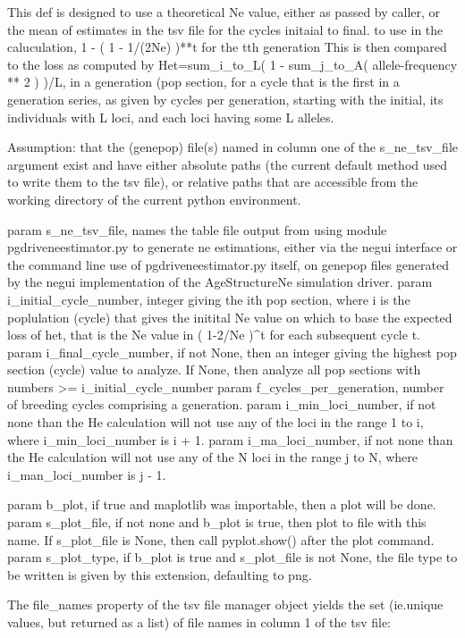 \begin{DoxyVerb}This def is designed to use a theoretical Ne value, either as passed by
caller, or the mean of estimates in the tsv file for the cycles initaial to final.
to use in the caluculation,
        1 - ( 1 - 1/(2Ne) )**t
for the tth generation This is then compared to the loss as computed by
Het=sum_i_to_L(  1 - sum_j_to_A( allele-frequency ** 2 ) )/L, in a generation
(pop section, for a cycle that is the first in a generation series, as given
by cycles per generation, starting with the initial, its individuals with
L loci, and each loci having some L alleles.

Assumption:  that the (genepop) file(s) named in column one of the s_ne_tsv_file 
        argument exist and have either absolute paths (the current
        default method used to write them to the tsv file), or relative
        paths that are accessible from the working directory of the
        current python environment.

param s_ne_tsv_file, names the table file output from using module
    pgdriveneestimator.py to generate ne estimations, either
    via the negui interface or the command line use of pgdriveneestimator.py 
    itself, on genepop files generated by the negui implementation of
    the AgeStructureNe simulation driver.
param i_initial_cycle_number, integer giving the ith pop section,
    where i is the poplulation (cycle) that gives the initital Ne value on which
    to base the expected loss of het, that is the Ne value in ( 1-2/Ne )^t for
    each subsequent cycle t.
param i_final_cycle_number, if not None, then an integer giving the highest pop section
    (cycle) value to analyze.  If None, then analyze all pop sections with numbers 
    >= i_initial_cycle_number
param f_cycles_per_generation, number of breeding cycles comprising a generation.
param i_min_loci_number, if not none than the He calculation will not use any of the loci
        in the range 1 to i, where i_min_loci_number is i + 1.
param i_ma_loci_number, if not none than the He calculation will not use any of the N loci
        in the range j to N, where i_man_loci_number is j - 1.

param b_plot, if true and maplotlib was importable, then a plot will be done.
param s_plot_file, if not none and b_plot is true, then plot to file with this name.
        If s_plot_file is None, then call pyplot.show() after the plot command.
param s_plot_type, if b_plot is true and s_plot_file is not None, the file type
        to be written is given by this extension, defaulting to png.\end{DoxyVerb}
\begin{DoxyVerb}The file_names property of the tsv file manager object
yields the set (ie.unique values, but returned as a list) 
of file names in column 1 of the tsv file:
\end{DoxyVerb}
 

